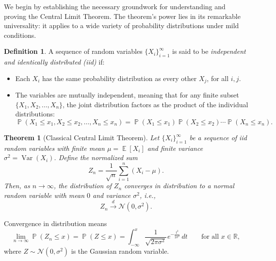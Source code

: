 \documentclass[letterpaper,11pt,oneside,reqno]{article}
\numberwithin{equation}{section}
\newcommand{\ssp}{\hspace{1pt}}
\newtheorem{theorem}[proposition]{Theorem}
\theoremstyle{definition}
\newtheorem{definition}[proposition]{Definition}
\begin{document}
We begin by establishing the necessary groundwork for understanding and proving
the Central Limit Theorem. The theorem's power lies in its remarkable universality:
it applies to a wide variety of probability distributions under mild conditions.

\begin{definition}
A sequence of random variables $\{X_i\}_{i=1}^{\infty}$ is said to be
\emph{independent and identically distributed (iid)}
if:

\begin{itemize}
    \item Each $X_i$ has the same probability distribution as every other $X_j$, for all $i, j$.
    \item The variables are mutually independent, meaning that for any finite subset $\{X_1, X_2, \dots, X_n\}$, the joint distribution factors as the product of the individual distributions:
    \[
			\operatorname{\mathbb{P}}(X_1 \leq x_1, X_2 \leq x_2, \dots, X_n \leq x_n)
			=
			\operatorname{\mathbb{P}}(X_1 \leq x_1)
			\operatorname{\mathbb{P}}(X_2 \leq x_2) \cdots \operatorname{\mathbb{P}}(X_n \leq x_n).
    \]
\end{itemize}
\end{definition}

\begin{theorem}[Classical Central Limit Theorem]
	Let $\{X_i\}_{i=1}^{\infty}$ be a sequence of iid random variables with finite mean $\mu = \operatorname{\mathbb{E}}[X_i]$ and finite
	variance $\sigma^2 = \operatorname{\mathrm{Var}}(X_i)$.
	Define the normalized sum
\begin{equation}
	\label{eq:normalized-sum}
	Z_n = \frac{1}{\sqrt{n}} \sum_{i=1}^n \left(X_i - \mu\right).
\end{equation}
Then, as $n \to \infty$, the distribution of $Z_n$ converges in distribution to a normal random variable with mean $0$ and variance $\sigma^2$, i.e.,
\[
Z_n \xrightarrow{d} \mathcal{N}(0, \sigma^2).
\]
\end{theorem}
Convergence in distribution means
\begin{equation}
	\label{eq:conv-in-dist}
	\lim_{n \to \infty} \operatorname{\mathbb{P}}(Z_n \leq x) = \operatorname{\mathbb{P}}(Z \leq x)
		= \int_{-\infty}^x \frac{1}{\sqrt{2\pi \sigma^2}}\ssp e^{-\frac{t^2}{2\sigma^2}} \, dt
	\qquad
	\text{for all } x \in \mathbb{R},
\end{equation}
where $Z \sim \mathcal{N}(0, \sigma^2)$ is the Gaussian random variable.
\end{document}

